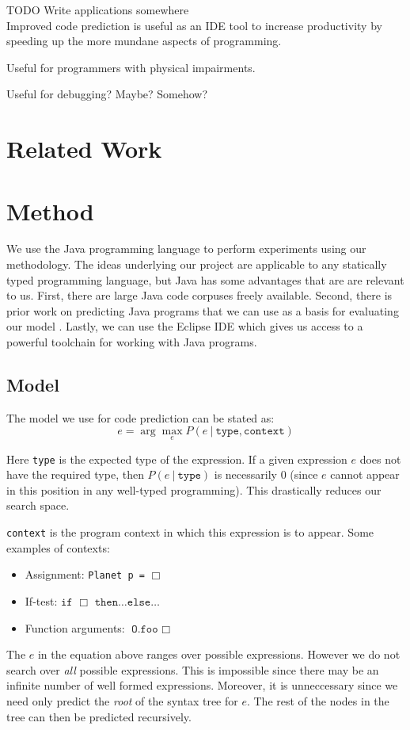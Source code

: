 \documentclass{article} %
\begin{document}
TODO Write applications somewhere\\
Improved code prediction is useful as an IDE tool to increase productivity by speeding up the more mundane aspects of programming.

Useful for programmers with physical impairments.

Useful for debugging? Maybe? Somehow?

\section*{Related Work}
\section*{Method}
We use the Java programming language to perform experiments using our methodology. The ideas underlying our project are applicable to any statically typed programming language, but Java has some advantages that are are relevant to us. First, there are large Java code corpuses freely available. Second, there is prior work on predicting Java programs that we can use as a basis for evaluating our model \cite{something}. Lastly, we can use the Eclipse IDE which gives us access to a powerful toolchain for working with Java programs.

\subsection*{Model}
The model we use for code prediction can be stated as:
$$ e = \arg\max_e P(e ~|~ \texttt{type} , \texttt{context} ) $$

Here \texttt{type} is the expected type of the expression. If a given expression $e$ does not have the required type, then $P(e ~|~ \texttt{type})$ is necessarily $0$ (since $e$ cannot appear in this position in any well-typed programming). This drastically reduces our search space.

\texttt{context} is the program context in which this expression is to appear. Some examples of contexts:
\begin{itemize}
  \item Assignment: \texttt{Planet p =} $\Box$
  \item If-test: $\texttt{if }\Box\texttt{ then}\ldots\texttt{else}\ldots$
  \item Function arguments: $\texttt{O.foo }\Box$
\end{itemize}

The $e$ in the equation above ranges over possible expressions. However we do not search over \emph{all} possible expressions. This is impossible since there may be an infinite number of well formed expressions. Moreover, it is unneccessary since we need only predict the \emph{root} of the syntax tree for $e$. The rest of the nodes in the tree can then be predicted recursively.
\end{document}
